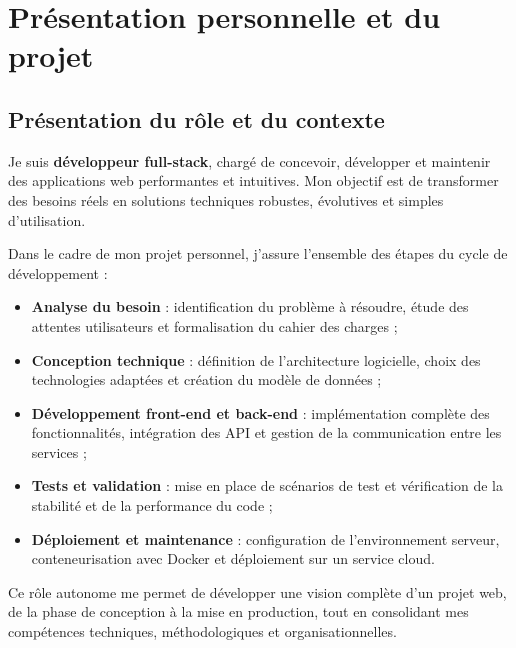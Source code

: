 \chapter{Présentation personnelle et du projet}

\section{Présentation du rôle et du contexte}

\begin{tcolorbox}[colback=blue!5!white,colframe=blue!60!black,title=\textbf{Mon rôle}]
Je suis \textbf{développeur full-stack}, chargé de concevoir, développer et maintenir des applications web performantes et intuitives.  
Mon objectif est de transformer des besoins réels en solutions techniques robustes, évolutives et simples d’utilisation.

Dans le cadre de mon projet personnel, j’assure l’ensemble des étapes du cycle de développement :
\begin{itemize}
    \item \textbf{Analyse du besoin} : identification du problème à résoudre, étude des attentes utilisateurs et formalisation du cahier des charges ;
    \item \textbf{Conception technique} : définition de l’architecture logicielle, choix des technologies adaptées et création du modèle de données ;
    \item \textbf{Développement front-end et back-end} : implémentation complète des fonctionnalités, intégration des API et gestion de la communication entre les services ;
    \item \textbf{Tests et validation} : mise en place de scénarios de test et vérification de la stabilité et de la performance du code ;
    \item \textbf{Déploiement et maintenance} : configuration de l’environnement serveur, conteneurisation avec Docker et déploiement sur un service cloud.
\end{itemize}

Ce rôle autonome me permet de développer une vision complète d’un projet web, de la phase de conception à la mise en production, tout en consolidant mes compétences techniques, méthodologiques et organisationnelles.
\end{tcolorbox}

